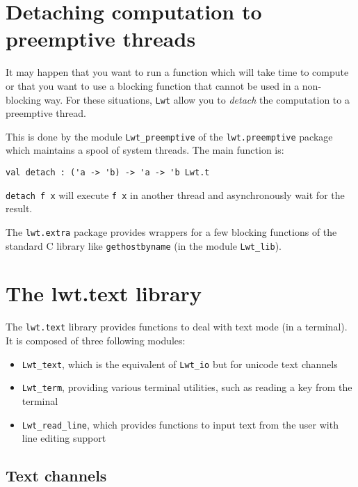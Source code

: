 \documentclass{article}
\newcommand{\lwt}{\texttt{Lwt}\xspace}
\begin{document}
\section{Detaching computation to preemptive threads}

It may happen that you want to run a function which will take time to
compute or that you want to use a blocking function that cannot be
used in a non-blocking way. For these situations, \lwt allow you to
\emph{detach} the computation to a preemptive thread.

This is done by the module \texttt{Lwt\_preemptive} of the
\texttt{lwt.preemptive} package which maintains a spool of system
threads. The main function is:

\begin{verbatim}
val detach : ('a -> 'b) -> 'a -> 'b Lwt.t
\end{verbatim}

\texttt{detach f x} will execute \texttt{f x} in another thread and
asynchronously wait for the result.

The \texttt{lwt.extra} package provides wrappers for a few blocking
functions of the standard C library like \texttt{gethostbyname} (in
the module \texttt{Lwt\_lib}).

\section{The lwt.text library}

The \texttt{lwt.text} library provides functions to deal with text
mode (in a terminal). It is composed of three following modules:

\begin{itemize}
\item \texttt{Lwt\_text}, which is the equivalent of \texttt{Lwt\_io}
  but for unicode text channels
\item \texttt{Lwt\_term}, providing various terminal utilities, such as
  reading a key from the terminal
\item \texttt{Lwt\_read\_line}, which provides functions to input text
  from the user with line editing support
\end{itemize}

\subsection{Text channels}
\end{document}

